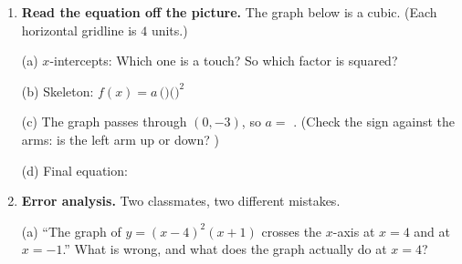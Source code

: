 \documentclass[10pt]{article}
\newcommand{\lgrid}[4]{%
  \draw[step=1, linegray!40, very thin] (#1,#3) grid (#2,#4);
  \draw[->, semithick, charcoal] (#1,0)--(#2,0) node[below right, font=\scriptsize]{$x$};
  \draw[->, semithick, charcoal] (0,#3)--(0,#4) node[left, font=\scriptsize]{$y$};}
\begin{document}
\begin{tcolorbox}[colback=white, colframe=black!40, title=\textbf{Tier A --- Approaching Proficiency},
    fonttitle=\bfseries, arc=1.5mm, left=3mm, right=3mm, top=2mm, bottom=2mm, breakable]
\begin{enumerate}[leftmargin=1.7em, itemsep=10pt]
    \vspace{2pt}
    (f) From the graph: \textbf{domain} , \textbf{range} . \;
    Relative maximum near $x\approx$ , relative minimum near $x\approx$ .

    \vspace{2pt}
    (g) Does this function have an \emph{absolute} maximum or minimum?  \; Explain using
    the degree: 

  \item \textbf{Read the equation off the picture.} The graph below is a cubic.
    (Each horizontal gridline is $4$ units.)
    \begin{center}
    \end{center}

    \vspace{2pt}
    (a) $x$-intercepts:  \; Which one is a touch?  \; So which factor is
    squared? 

    \vspace{2pt}
    (b) Skeleton: $f(x) = a\,($$)($$)^2$

    \vspace{2pt}
    (c) The graph passes through $(0,-3)$, so $a = $ . \; (Check the sign against the
    arms: is the left arm up or down? )

    \vspace{2pt}
    (d) Final equation: 

  \item \textbf{Error analysis.} Two classmates, two different mistakes.

    \vspace{2pt}
    (a) ``The graph of $y=(x-4)^2(x+1)$ crosses the $x$-axis at $x=4$ and at $x=-1$.''
    What is wrong, and what does the graph actually do at $x=4$? 


\end{enumerate}
\end{tcolorbox}
\end{document}
